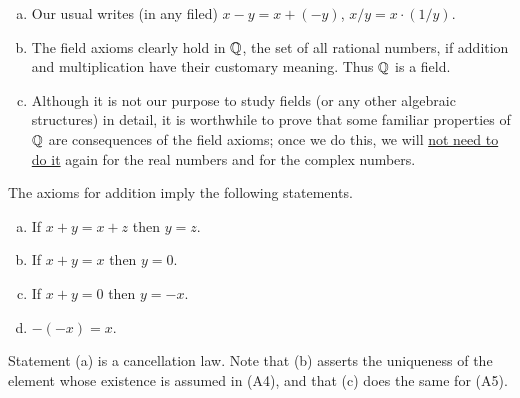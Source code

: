 \begin{myRemark}
    \label{myRemark:1.13}
    \begin{enumerate}[(a)]
        \item Our usual writes (in any filed) $x-y = x+(-y)$, $x/y=x\cdot (1/y)$.
        \item The field axioms clearly hold in ${\protect\mathbb Q} $, 
        the set of all rational numbers, 
        if addition and multiplication have their customary meaning. 
        Thus ${\protect\mathbb Q} $ is a field.
        \item Although it is not our purpose to study fields 
        (or any other algebraic structures) in detail, 
        it is worthwhile to prove that some familiar properties of ${\protect\mathbb Q} $ are consequences of the field axioms; 
        once we do this, we will \underline{not need to do it} again for the real numbers and for the complex numbers.
    \end{enumerate}
\end{myRemark}
 


\begin{myProposition}
    \label{myProposition:1.14}
    The axioms for addition imply the following statements.
    \begin{enumerate}[(a)]
        \item If $x+y=x+z$ then $y=z$.
        \item If $x+y=x$ then $y=0$.
        \item If $x+y=0$ then $y= -x$.
        \item $-(-x)=x$.
    \end{enumerate}
\end{myProposition}

Statement (a) is a cancellation law. 
Note that (b) asserts the uniqueness of the element 
whose existence is assumed in (A4), 
and that (c) does the same for (A5).



